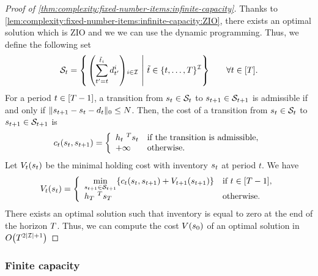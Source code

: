 \begin{proof}[Proof of \cref{thm:complexity:fixed-number-items:infinite-capacity}]
Thanks to \cref{lem:complexity:fixed-number-items:infinite-capacity:ZIO}, there exists an optimal solution which is ZIO and we we can use the dynamic programming.
Thus, we define the following set
\begin{equation}
\cS_t =
\left\{
\left.
\bracket{\sum_{t'=t}^{\tilde{t}_i}\demand_{t'}^i}_{i\in\REF}
\ \right| \ 
\tilde{t} \in \range[t]{\horizon}^{\REF}
\right\}\qquad\forall t\in\range{\horizon}.
\end{equation}
For a period $t\in\range{\horizon-1}$, a transition from $s_t\in\mathcal{S}_t$ to $s_{t+1}\in\mathcal{S}_{t+1}$ is admissible if and only if $\norm{\inventory_{t+1}-\inventory_t-\demand_t}_0\le\nbsetups$.
Then, the cost of a transition from $s_t\in\mathcal{S}_t$ to $s_{t+1}\in\mathcal{S}_{t+1}$ is
\begin{equation}
c_t\bracket{\inventory_t,\inventory_{t+1}} =
\left\{
\begin{array}{ll}
\holding_t\ ^T\inventory_t & \mbox{if the transition is admissible},
\\
+\infty & \mbox{otherwise}.
\end{array}
\right.
\end{equation}
Let $V_t\bracket{\inventory_t}$ be the minimal holding cost with inventory $s_t$ at period $t$.
We have
\begin{equation}
V_t\bracket{\inventory_t} =
\left\{
\begin{array}{ll}
\ds \min_{\inventory_{t+1}\in\cS_{t+1}} \crbracket{c_t\bracket{\inventory_t,\inventory_{t+1}} + V_{t+1}\bracket{\inventory_{t+1}}}
&
\mbox{if}\ t\in\range{\horizon-1},
\\
\ds 
\holding_{\horizon}\ ^T\inventory_{\horizon}
&
\mbox{otherwise}.
\end{array}
\right.
\end{equation}
There exists an optimal solution such that inventory is equal to zero at the end of the horizon $T$.
Thus, we can compute the cost $V\bracket{\inventory_0}$ of an optimal solution in $O\bracket{\horizon^{2\card{\REF}+1}}$
\end{proof}


\subsubsection{Finite capacity}


